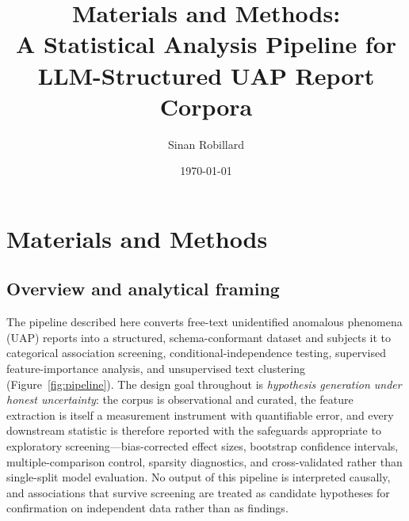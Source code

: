 \documentclass[11pt,a4paper]{article}
\title{Materials and Methods:\\ A Statistical Analysis Pipeline for LLM-Structured UAP Report Corpora}
\author{Sinan Robillard}
\date{\today}
\begin{document}
\maketitle

\section{Materials and Methods}

\subsection{Overview and analytical framing}

The pipeline described here converts free-text unidentified anomalous phenomena (UAP)
reports into a structured, schema-conformant dataset and subjects it to categorical
association screening, conditional-independence testing, supervised feature-importance
analysis, and unsupervised text clustering (Figure~\ref{fig:pipeline}). The design goal
throughout is \emph{hypothesis generation under honest uncertainty}: the corpus is
observational and curated, the feature extraction is itself a measurement instrument
with quantifiable error, and every downstream statistic is therefore reported with the
safeguards appropriate to exploratory screening---bias-corrected effect sizes, bootstrap
confidence intervals, multiple-comparison control, sparsity diagnostics, and
cross-validated rather than single-split model evaluation. No output of this pipeline is
interpreted causally, and associations that survive screening are treated as candidate
hypotheses for confirmation on independent data rather than as findings.
\end{document}
